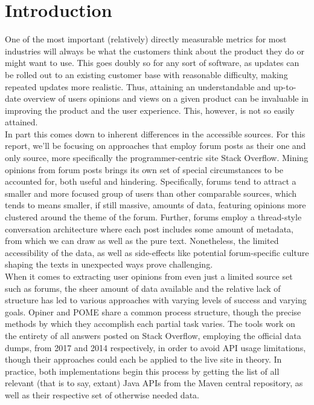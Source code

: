 \documentclass[a4paper,10pt, bibliography=totocnumbered]{scrreprt}
\begin{document}
\chapter{Introduction}
One of the most important (relatively) directly measurable metrics for most industries will always be what the customers think about the product they do or might want to use. This goes doubly so for any sort of software, as updates can be rolled out to an existing customer base with reasonable difficulty, making repeated updates more realistic. Thus, attaining an understandable and up-to-date overview of users opinions and views on a given product can be invaluable in improving the product and the user experience. This, however, is not so easily attained.\\
In part this comes down to inherent differences in the accessible sources. For this report, we'll be focusing on approaches that employ forum posts as their one and only source, more specifically the programmer-centric site Stack Overflow. Mining opinions from forum posts brings its own set of special circumstances to be accounted for, both useful and hindering. Specifically, forums tend to attract a smaller and more focused group of users than other comparable sources, which tends to means smaller, if still massive, amounts of data, featuring opinions more clustered around the theme of the forum. Further, forums employ a thread-style conversation architecture where each post includes some amount of metadata, from which we can draw as well as the pure text. Nonetheless, the limited accessibility of the data, as well as side-effects like potential forum-specific culture shaping the texts in unexpected ways prove challenging.\\
When it comes to extracting user opinions from even just a limited source set such as forums, the sheer amount of data available and the relative lack of structure has led to various approaches with varying levels of success and varying goals. Opiner\cite {OPINER} and POME\cite{POME} share a common process structure, though the precise methods by which they accomplish each partial task varies. The tools work on the entirety of all answers posted on Stack Overflow, employing the official data dumps, from 2017 and 2014 respectively, in order to avoid API usage limitations, though their approaches could each be applied to the live site in theory. In practice, both implementations begin this process by getting the list of all relevant (that is to say, extant) Java APIs from the Maven central repository, as well as their respective set of otherwise needed data.\\
\end{document}
